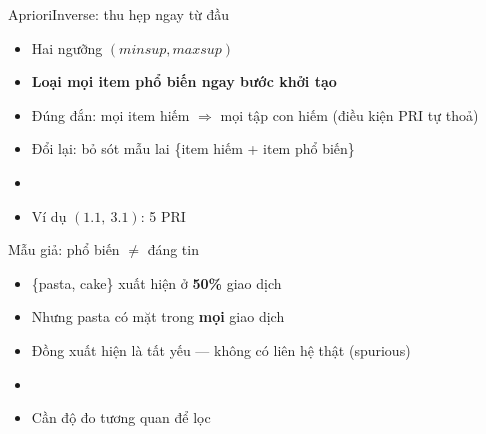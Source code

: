 \documentclass[aspectratio=169,11pt]{beamer}
\begin{document}
\begin{frame}{AprioriInverse: thu hẹp ngay từ đầu}
\begin{itemize}\itemsep0.6em
  \item Hai ngưỡng $(minsup, maxsup)$
  \item \textbf{Loại mọi item phổ biến ngay bước khởi tạo}
  \item Đúng đắn: mọi item hiếm $\Rightarrow$ mọi tập con hiếm (điều kiện PRI tự thoả)
  \item \alert{Đổi lại: bỏ sót mẫu lai \{item hiếm + item phổ biến\}}
  \item[]
  \item Ví dụ $(1.1,\ 3.1)$: 5 PRI 
\end{itemize}
\end{frame}

\begin{frame}{Mẫu giả: phổ biến $\ne$ đáng tin}
\begin{itemize}\itemsep0.7em
  \item \{pasta, cake\} xuất hiện ở \textbf{50\%} giao dịch
  \item Nhưng pasta có mặt trong \textbf{mọi} giao dịch
  \item Đồng xuất hiện là tất yếu --- \alert{không có liên hệ thật} (spurious)
  \item[]
  \item Cần độ đo tương quan để lọc
\end{itemize}
\end{frame}
\end{document}
